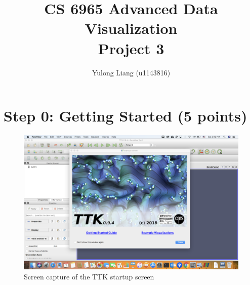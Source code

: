\documentclass[12pt]{article}
\begin{document}
\title{CS 6965 Advanced Data Visualization\\{\bf Project 3}}
\author{Yulong Liang (u1143816)}
\maketitle

\section*{Step 0: Getting Started (5 points)}

\begin{figure}[h]
\centering
\includegraphics[width=1\linewidth]{1.png}
\caption{Screen capture of the TTK startup screen}
\label{fig:name}
\end{figure}
\end{document}
